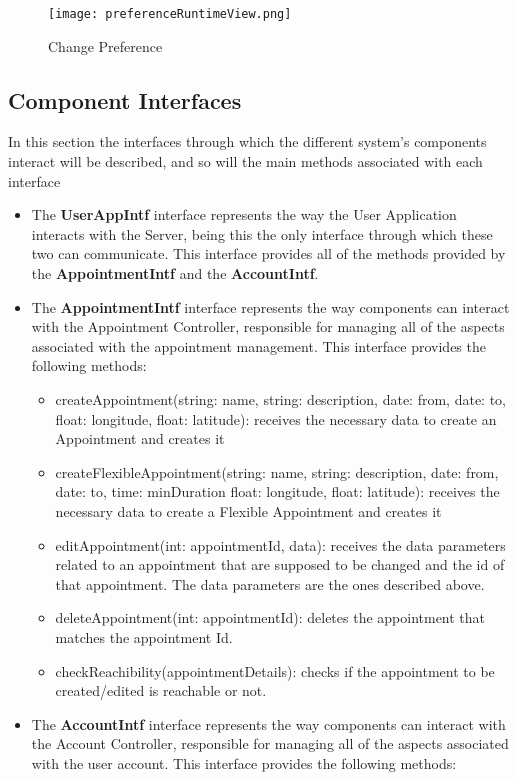 \documentclass[12pt]{article}
\begin{document}
\begin{figure}[H]
    \centering
    \texttt{[image: preferenceRuntimeView.png]}
    \caption{Change Preference}
    \label{fig:preferenceRuntime}
\end{figure}

\subsection{Component Interfaces}
In this section the interfaces through which the different system's components interact will be described, and so will the main methods associated with each interface
\begin{itemize}
    \item The \textbf{UserAppIntf} interface represents the way the User Application interacts with the Server, being this the only interface through which these two can communicate. This interface provides all of the methods provided by the \textbf{AppointmentIntf} and the \textbf{AccountIntf}.
    \item The \textbf{AppointmentIntf} interface represents the way components can interact with the Appointment Controller, responsible for managing all of the aspects associated with the appointment management. This interface provides the following methods:
    \begin{itemize}
        \item createAppointment(string: name, string: description, date: from, date: to, float: longitude, float: latitude): receives the necessary data to create an Appointment and creates it
        \item createFlexibleAppointment(string: name, string: description, date: from, date: to, time: minDuration float: longitude, float: latitude): receives the necessary data to create a Flexible Appointment and creates it
        \item editAppointment(int: appointmentId, data): receives the data parameters related to an appointment that are supposed to be changed and the id of that appointment. The data parameters are the ones described above.
        \item deleteAppointment(int: appointmentId): deletes the appointment that matches the appointment Id.
        \item checkReachibility(appointmentDetails): checks if the appointment to be created/edited is reachable or not.
    \end{itemize}
    \item The \textbf{AccountIntf} interface represents the way components can interact with the Account Controller, responsible for managing all of the aspects associated with the user account. This interface provides the following methods:

\end{itemize}
\end{document}
